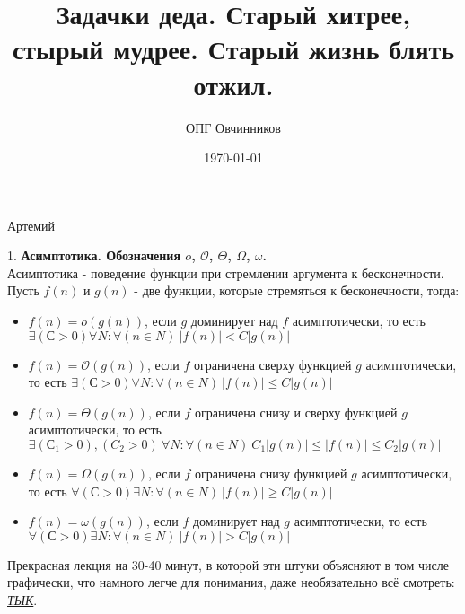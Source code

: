 \documentclass[12pt]{article}
\title{Задачки деда. Старый хитрее, стырый мудрее. Старый жизнь блять отжил.}
\author{ОПГ Овчинников}
\date{\today}
\begin{document}
\maketitle
\large

\begin{center}
    Артемий
\end{center}

1. \textbf{Асимптотика. Обозначения $o$, $\mathcal{O}$, $\Theta$, $\Omega$, $\omega$.}\\
Асимптотика - поведение функции при стремлении аргумента к бесконечности.\\
Пусть $f(n)$ и $g(n)$ - две функции, которые стремяться к бесконечности, тогда:
\begin{itemize}
    \item $f(n) = o(g(n))$, если $g$ доминирует над $f$ асимптотически, то есть $\exists (С > 0) \forall N : \forall(n \in N)\ |f(n)| < C|g(n)|$
    \item $f(n) = \mathcal{O}(g(n))$, если $f$ ограничена сверху функцией $g$ асимптотически, то есть $\exists (С > 0) \forall N : \forall(n \in N)\ |f(n)| \leq C|g(n)|$
    \item $f(n) = \Theta(g(n))$, если $f$ ограничена снизу и сверху функцией 
    $g$ асимптотически, то есть $\exists (С_{1} > 0), (C_{2} > 0) \ \forall N : \forall(n \in N)\ C_{1}|g(n)| \leq |f(n)| \leq C_{2}|g(n)|$
    \item $f(n) = \Omega(g(n))$, если $f$ ограничена снизу функцией 
    $g$ асимптотически, то есть $\forall (С > 0) \exists N : \forall(n \in N)\ |f(n)| \geq C|g(n)|$
    \item $f(n) = \omega(g(n))$, если $f$ доминирует над $g$ асимптотически, то есть $\forall (С > 0) \exists N : \forall(n \in N)\ |f(n)| > C|g(n)|$
\end{itemize}

Прекрасная лекция на 30-40 минут, в которой эти штуки объясняют в том числе графически, что намного легче для понимания, даже необязательно всё смотреть: \href{https://www.youtube.com/watch?v=dpdimxKMMTc}{\textit{ТЫК}}.
\end{document}
